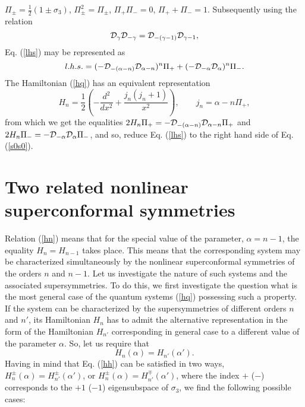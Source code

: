 \documentclass[a4paper,12pt]{article}
\begin{document}
$\Pi_\pm=\frac{1}{2}(1\pm \sigma_3)$, $\Pi_\pm^2=\Pi_\pm$,
$\Pi_+\Pi_-=0$,
$\Pi_++\Pi_-=1$.
Subsequently using the relation
$$
{\cal D}_\gamma{\cal D}_{-\gamma}=
{\cal D}_{-(\gamma-1)}{\cal D}_{\gamma-1},
$$
Eq. (\ref{lhs}) may be represented as
$$
l.h.s.=(-{\cal D}_{-(\alpha-n)}{\cal D}_{\alpha -n})^n\Pi_+
+(-{\cal D}_{-\alpha}{\cal D}_{\alpha})^n\Pi_-.
$$
The Hamiltonian (\ref{hq}) has an equivalent representation
\begin{equation}
H_n=\frac{1}{2}\left(-\frac{d^2}{dx^2}+\frac{j_n(j_n+1)}{x^2
}\right),
\qquad j_n=\alpha -n\Pi_+,
\label{hj}
\end{equation}
from which we get the equalities
$2H_n\Pi_+=-{\cal D}_{-(\alpha-n)}{\cal D}_{\alpha -n}\Pi_+$
and
$2H_n\Pi_-=-{\cal D}_{-\alpha}{\cal D}_{\alpha}\Pi_-$,
and so, reduce Eq. (\ref{lhs}) to the right hand side of
Eq. (\ref{s0s0}).




\section{Two related nonlinear superconformal symmetries}

Relation (\ref{hn}) means that for the special value of the
parameter, $\alpha=n-1$, the equality $H_n=H_{n-1}$
takes place.
This means that the corresponding system
may be characterized simultaneously by the nonlinear
superconformal symmetries of the orders $n$ and $n-1$.
Let us investigate the nature of such systems
and the associated supersymmetries.
To do this, we first investigate the question
what is the most general case of the quantum systems
(\ref{hq}) possessing such a property.
If the system can be characterized by the supersymmetries
of different orders $n$ and $n'$,
its Hamiltonian $H_n$ has to admit
the alternative representation in the form
of the Hamiltonian $H_{n'}$ corresponding
in general case to a different value of the
parameter $\alpha$.
So, let us require that
\begin{equation}
H_n(\alpha)=H_{n'}(\alpha ').
\label{hh}
\end{equation}
Having in mind that Eq. (\ref{hh})
can be satisfied in two ways,
$H^\pm_n(\alpha)=H^\pm_{n '}(\alpha ')$,
or
$H^\pm_n(\alpha)=H^\mp_{n '}(\alpha ')$,
where the index $+$ ($-$) corresponds to the $+1$
($-1$) eigensubspace of $\sigma_3$,
we find the following possible cases:
\end{document}
